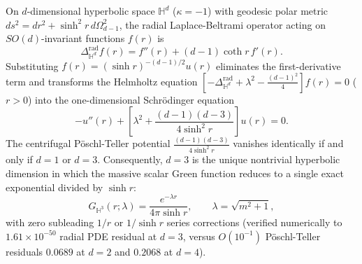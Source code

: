 \documentclass[aps,prd,twocolumn,nofootinbib,floatfix]{revtex4-2}
\begin{document}
On $d$-dimensional hyperbolic space $\mathbb{H}^d$ ($\kappa = -1$) with geodesic polar metric $ds^2 = dr^2 + \sinh^2 r\,d\Omega_{d-1}^2$, the radial Laplace-Beltrami operator acting on $SO(d)$-invariant functions $f(r)$ is
\begin{equation}
\label{eq:radial_laplacian}
\Delta_{\mathbb{H}^d}^{\mathrm{rad}} f(r) = f''(r) + (d - 1)\coth r\,f'(r).
\end{equation}
Substituting $f(r) = (\sinh r)^{-(d-1)/2} u(r)$ eliminates the first-derivative term and transforms the Helmholtz equation $[-\Delta_{\mathbb{H}^d}^{\mathrm{rad}} + \lambda^2 - \frac{(d-1)^2}{4}]f(r) = 0$ ($r > 0$) into the one-dimensional Schr\"odinger equation
\begin{equation}
\label{eq:liouville_poschl_teller}
-u''(r) + \left[\lambda^2 + \frac{(d-1)(d-3)}{4\sinh^2 r}\right] u(r) = 0.
\end{equation}
The centrifugal P\"oschl-Teller potential $\frac{(d-1)(d-3)}{4\sinh^2 r}$ vanishes identically if and only if $d = 1$ or $d = 3$.
Consequently, $d = 3$ is the unique nontrivial hyperbolic dimension in which the massive scalar Green function reduces to a single exact exponential divided by $\sinh r$:
\begin{equation}
\label{eq:gh3_exact}
G_{\mathbb{H}^3}(r;\lambda) = \frac{e^{-\lambda r}}{4\pi\sinh r}, \qquad \lambda = \sqrt{m^2 + 1},
\end{equation}
with zero subleading $1/r$ or $1/\sinh r$ series corrections (verified numerically to $1.61\times 10^{-50}$ radial PDE residual at $d = 3$, versus $O(10^{-1})$ P\"oschl-Teller residuals $0.0689$ at $d = 2$ and $0.2068$ at $d = 4$).
\end{document}
